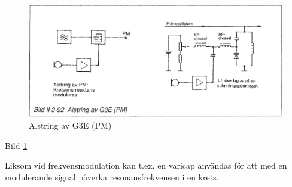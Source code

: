 \begin{figure}
\includegraphics[width=\textwidth]{images/bild_2_3-92}
\caption{Alstring av G3E (PM)}
\label{fig:BildII3-92}
\end{figure}

Bild \ref{fig:BildII3-92}

Liksom vid frekvensmodulation kan t.ex. en varicap användas för att
med en modulerande signal påverka resonansfrekvensen i en krets.
